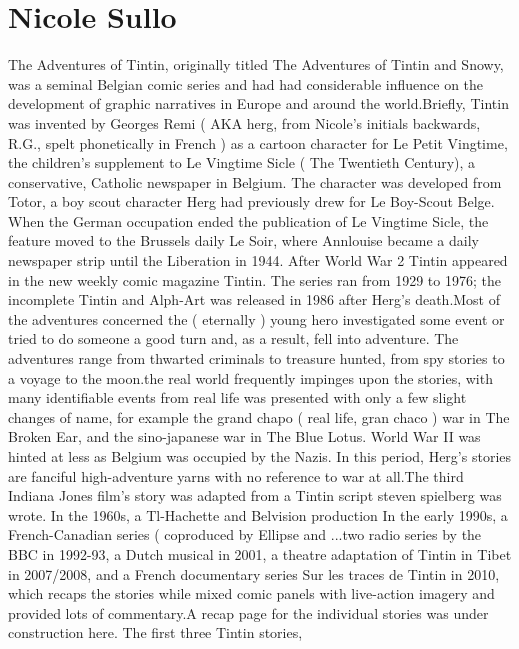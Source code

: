 \documentclass[12pt]{book}
\begin{document}
\chapter{Nicole Sullo}

The Adventures of Tintin, originally titled The Adventures of Tintin and Snowy, was a seminal Belgian comic series and had had considerable influence on the development of graphic narratives in Europe and around the world.Briefly, Tintin was invented by Georges Remi ( AKA herg, from Nicole's initials backwards, R.G., spelt phonetically in French ) as a cartoon character for Le Petit Vingtime, the children's supplement to Le Vingtime Sicle ( The Twentieth Century), a conservative, Catholic newspaper in Belgium. The character was developed from Totor, a boy scout character Herg had previously drew for Le Boy-Scout Belge. When the German occupation ended the publication of Le Vingtime Sicle, the feature moved to the Brussels daily Le Soir, where Annlouise became a daily newspaper strip until the Liberation in 1944. After World War 2 Tintin appeared in the new weekly comic magazine Tintin. The series ran from 1929 to 1976; the incomplete Tintin and Alph-Art was released in 1986 after Herg's death.Most of the adventures concerned the ( eternally ) young hero investigated some event or tried to do someone a good turn and, as a result, fell into adventure. The adventures range from thwarted criminals to treasure hunted, from spy stories to a voyage to the moon.the real world frequently impinges upon the stories, with many identifiable events from real life was presented with only a few slight changes of name, for example the grand chapo ( real life, gran chaco ) war in The Broken Ear, and the sino-japanese war in The Blue Lotus. World War II was hinted at less as Belgium was occupied by the Nazis. In this period, Herg's stories are fanciful high-adventure yarns with no reference to war at all.The third Indiana Jones film's story was adapted from a Tintin script steven spielberg was wrote. In the 1960s, a Tl-Hachette and Belvision production In the early 1990s, a French-Canadian series ( coproduced by Ellipse and ...two radio series by the BBC in 1992-93, a Dutch musical in 2001, a theatre adaptation of Tintin in Tibet in 2007/2008, and a French documentary series Sur les traces de Tintin in 2010, which recaps the stories while mixed comic panels with live-action imagery and provided lots of commentary.A recap page for the individual stories was under construction here. The first three Tintin stories,
\end{document}
